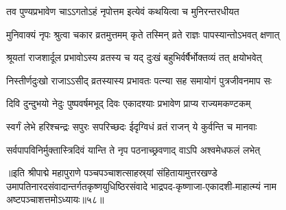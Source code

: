 \twolineshloka
{तव पुण्यप्रभावेण चाऽऽगतोऽहं नृपोत्तम}
{इत्येवं कथयित्वा च मुनिरन्तरधीयत}%

\twolineshloka
{मुनिवाक्यं नृपः श्रुत्वा चकार व्रतमुत्तमम्}
{कृते तस्मिन् व्रते राज्ञः पापस्यान्तोऽभवत् क्षणात्}%

\twolineshloka
{श्रूयतां राजशार्दूल प्रभावोऽस्य व्रतस्य च}
{यद् दुःखं बहुभिर्वर्षैर्भोक्तव्यं तत् क्षयोभवेत्}%

\twolineshloka
{निस्तीर्णदुःखो राजाऽऽसीद् व्रतस्यास्य प्रभावतः}
{पत्न्या सह समायोगं पुत्रजीवनमाप सः}%

\twolineshloka
{दिवि दुन्दुभयो नेदुः पुष्पवर्षमभूद् दिवः}
{एकादश्याः प्रभावेण प्राप्य राज्यमकण्टकम्}%

\twolineshloka
{स्वर्गं लेभे हरिश्चन्द्रः सपुरः सपरिच्छदः}
{ईदृग्विधं व्रतं राजन् ये कुर्वन्ति च मानवाः}%

\twolineshloka
{सर्वपापविनिर्मुक्तास्त्रिदिवं यान्ति ते नृप}
{पठनाच्छ्रवणाद् वाऽपि अश्वमेधफलं लभेत्}%

॥इति श्रीपाद्मे महापुराणे पञ्चपञ्चाशत्साहस्र्यां संहितायामुत्तरखण्डे उमापतिनारदसंवादान्तर्गतकृष्णयुधिष्ठिरसंवादे भाद्रपद-कृष्णाजा-एकादशी-माहात्म्यं नाम अष्टपञ्चाशत्तमोऽध्यायः॥५८॥

\genMangalaShloka

\hyperref[sec:ekadashi_mahatmyam_padma_puranam]{\closesub}
\clearpage

